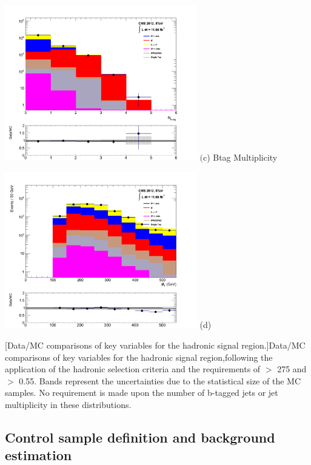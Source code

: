\xspace

\begin{minipage}{\linewidth}
\begin{minipage}{.48\textwidth}
\centering
\includegraphics[width = 3.3in]{plots/had_nbtag_datamc.pdf}
$\text{(c}$) Btag Multiplicity
\end{minipage}
\begin{minipage}{.48\textwidth}
\centering
\includegraphics[width = 3.3in]{plots/had_mht_datamc.pdf}
(d) \mht
\end{minipage}
[Data/MC comparisons of key variables for the hadronic signal region.]{Data/MC comparisons of key variables for the hadronic signal region,following the application of the hadronic selection criteria and the requirements of \theht $>$ 275 \GeV and \alphat $>$ 0.55. Bands represent the uncertainties due to the statistical size of the MC samples. No requirement is made upon the number of b-tagged jets or jet multiplicity in these distributions.}\label{fig:hadmcplots}
\end{minipage}

\subsection{Control sample definition and background estimation}
\label{subsec:controlsampledefinition}


